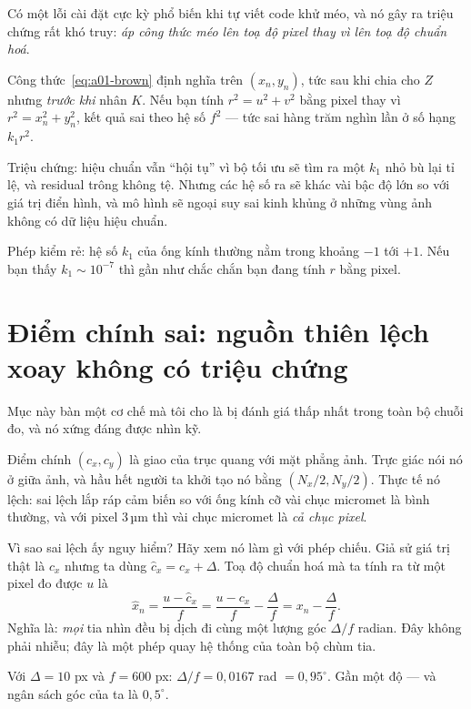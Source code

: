 \documentclass[../../marker.tex]{subfiles}
\begin{document}
\begin{cambay}
Có một lỗi cài đặt cực kỳ phổ biến khi tự viết code khử méo, và nó gây ra triệu chứng rất khó truy: \emph{áp công thức méo lên toạ độ pixel thay vì lên toạ độ chuẩn hoá}.

Công thức~\eqref{eq:a01-brown} định nghĩa trên \((x_n, y_n)\), tức sau khi chia cho \(Z\) nhưng \emph{trước khi} nhân \(K\). Nếu bạn tính \(r^2 = u^2 + v^2\) bằng pixel thay vì \(r^2 = x_n^2 + y_n^2\), kết quả sai theo hệ số \(f^2\) --- tức sai hàng trăm nghìn lần ở số hạng \(k_1 r^2\).

Triệu chứng: hiệu chuẩn vẫn ``hội tụ'' vì bộ tối ưu sẽ tìm ra một \(k_1\) nhỏ bù lại tỉ lệ, và residual trông không tệ. Nhưng các hệ số ra sẽ khác vài bậc độ lớn so với giá trị điển hình, và mô hình sẽ ngoại suy sai kinh khủng ở những vùng ảnh không có dữ liệu hiệu chuẩn.

Phép kiểm rẻ: hệ số \(k_1\) của ống kính thường nằm trong khoảng \(-1\) tới \(+1\). Nếu bạn thấy \(k_1 \sim 10^{-7}\) thì gần như chắc chắn bạn đang tính \(r\) bằng pixel.
\end{cambay}

\section{Điểm chính sai: nguồn thiên lệch xoay không có triệu chứng}

Mục này bàn một cơ chế mà tôi cho là bị đánh giá thấp nhất trong toàn bộ chuỗi đo, và nó xứng đáng được nhìn kỹ.

Điểm chính \((c_x, c_y)\) là giao của trục quang với mặt phẳng ảnh. Trực giác nói nó ở giữa ảnh, và hầu hết người ta khởi tạo nó bằng \((N_x/2, N_y/2)\). Thực tế nó lệch: sai lệch lắp ráp cảm biến so với ống kính cỡ vài chục micromet là bình thường, và với pixel 3\,µm thì vài chục micromet là \emph{cả chục pixel}.

Vì sao sai lệch ấy nguy hiểm? Hãy xem nó làm gì với phép chiếu. Giả sử giá trị thật là \(c_x\) nhưng ta dùng \(\hat{c}_x = c_x + \Delta\). Toạ độ chuẩn hoá mà ta tính ra từ một pixel đo được \(u\) là
\[
\hat{x}_n = \frac{u - \hat{c}_x}{f} = \frac{u - c_x}{f} - \frac{\Delta}{f} = x_n - \frac{\Delta}{f}.
\]
Nghĩa là: \emph{mọi} tia nhìn đều bị dịch đi cùng một lượng góc \(\Delta/f\) radian. Đây không phải nhiễu; đây là một phép quay hệ thống của toàn bộ chùm tia.

Với \(\Delta = 10\) px và \(f = 600\) px: \(\Delta/f = 0{,}0167\) rad \(= 0{,}95^\circ\). Gần một độ --- và ngân sách góc của ta là \(0{,}5^\circ\).
\end{document}
